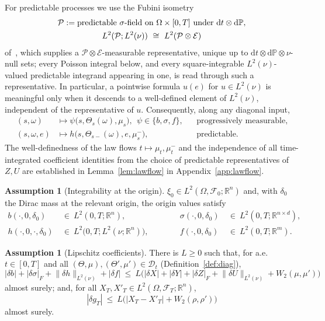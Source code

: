 \documentclass[preprint,12pt]{elsarticle}
\newcommand{\R}{\mathbb{R}}
\newcommand{\Prob}{\mathbb{P}}
\newcommand{\F}{\mathcal{F}}
\newcommand{\diff}{\mathrm{d}}
\newcommand{\Lnu}{L^2(\nu)}
\newcommand{\Lnorm}[1]{\lVert #1\rVert_{\Lnu}}
\numberwithin{equation}{section}
\theoremstyle{plain}
\theoremstyle{definition}
\newtheorem{assumption}[theorem]{Assumption}
\theoremstyle{\PaperRemarkStyle}
\begin{document}
For predictable processes we use the Fubini isometry
\begin{gather}
\mathcal P:=\text{predictable $\sigma$-field on }\Omega\times[0,T]\text{ under }\diff t\otimes\diff\Prob,\notag\\
L^2(\mathcal P;\Lnu)\ \cong\ L^2(\mathcal P\otimes\mathcal E)\label{eq:fubiniiso}
\end{gather}
of~\cite[Propositions~1.2.24 and~1.2.25]{HNVW}, which supplies a
$\mathcal P\otimes\mathcal E$-measurable representative, unique up to
$\diff t\otimes\diff\Prob\otimes\nu$-null sets; every Poisson integral below, and every
square-integrable $\Lnu$-valued predictable integrand appearing in one, is read through
such a representative. In particular, a pointwise formula $u(e)$ for $u\in\Lnu$ is
meaningful only when it descends to a well-defined element of $\Lnu$, independent of
the representative of $u$. Consequently, along any diagonal input,
\begin{equation}\label{eq:coefmeas}
\begin{aligned}
(s,\omega)&\mapsto\psi\big(s,\Theta_s(\omega),\mu_s\big),\ \ \psi\in\{b,\sigma,f\},
&&\text{progressively measurable},\\[2pt]
(s,\omega,e)&\mapsto h\big(s,\Theta_{s-}(\omega),e,\mu_s^-\big),
&&\text{predictable}.
\end{aligned}
\end{equation}
The well-definedness of the law flows $t\mapsto\mu_t,\mu_t^-$ and the independence of all
time-integrated coefficient identities from the choice of predictable representatives of
$Z,U$ are established in Lemma~\ref{lem:lawflow} in Appendix~\ref{app:lawflow}.

\begin{assumption}[Integrability at the origin]\label{ass:integ}
$\xi_0\in L^2(\Omega,\F_0;\R^n)$ and, with $\delta_0$ the Dirac mass at the relevant origin,
the origin values satisfy
\[
\begin{aligned}
b(\cdot,0,\delta_0)\ &\in\ L^2(0,T;\R^n),
&\qquad\quad \sigma(\cdot,0,\delta_0)\ &\in\ L^2(0,T;\R^{n\times d}),\\[2.2ex]
h(\cdot,0,\cdot,\delta_0)\ &\in\ L^2\bigl(0,T;L^2(\nu;\R^n)\bigr),
&\qquad\quad f(\cdot,0,\delta_0)\ &\in\ L^2(0,T;\R^m).
\end{aligned}
\]
\end{assumption}
\begin{assumption}[Lipschitz coefficients]\label{ass:lip}
There is $L\ge0$ such that, for a.e.\ $t\in[0,T]$ and all
$(\Theta,\mu),(\Theta',\mu')\in\mathcal D_t$ (Definition~\ref{def:diag}),
\[
|\delta b|+|\delta\sigma|_F+\Lnorm{\delta h}+|\delta f|
\ \le\ L\bigl(|\delta X|+|\delta Y|+|\delta Z|_F+\Lnorm{\delta U}+W_2(\mu,\mu')\bigr)
\]
almost surely; and, for all $X_T,X'_T\in L^2(\Omega,\F_T;\R^n)$,
\begin{equation}\label{eq:lipT}
|\delta g_T|\ \le\ L\bigl(|X_T-X'_T|+W_2(\rho,\rho')\bigr)
\end{equation}
almost surely.
\end{assumption}
\end{document}
